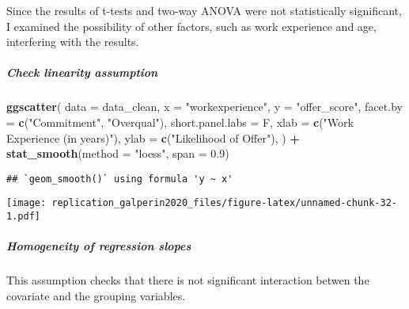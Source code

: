 \documentclass[]{article}
\newenvironment{Shaded}{\begin{snugshade}}{\end{snugshade}}
\newcommand{\DataTypeTok}[1]{\textcolor[rgb]{0.13,0.29,0.53}{#1}}
\newcommand{\FloatTok}[1]{\textcolor[rgb]{0.00,0.00,0.81}{#1}}
\newcommand{\KeywordTok}[1]{\textcolor[rgb]{0.13,0.29,0.53}{\textbf{#1}}}
\newcommand{\NormalTok}[1]{#1}
\newcommand{\OperatorTok}[1]{\textcolor[rgb]{0.81,0.36,0.00}{\textbf{#1}}}
\newcommand{\StringTok}[1]{\textcolor[rgb]{0.31,0.60,0.02}{#1}}
\let\oldsubparagraph\subparagraph
\renewcommand{\subparagraph}[1]{\oldsubparagraph{#1}\mbox{}}
\begin{document}
Since the results of t-tests and two-way ANOVA were not statistically
significant, I examined the possibility of other factors, such as work
experience and age, interfering with the results.

\hypertarget{check-linearity-assumption}{%
\subparagraph{Check linearity
assumption}\label{check-linearity-assumption}}

\begin{Shaded}
\begin{Highlighting}[]
\KeywordTok{ggscatter}\NormalTok{(}
  \DataTypeTok{data =}\NormalTok{ data_clean, }\DataTypeTok{x =} \StringTok{"workexperience"}\NormalTok{, }\DataTypeTok{y =} \StringTok{"offer_score"}\NormalTok{,}
  \DataTypeTok{facet.by =} \KeywordTok{c}\NormalTok{(}\StringTok{"Commitment"}\NormalTok{, }\StringTok{"Overqual"}\NormalTok{),}
  \DataTypeTok{short.panel.labs =}\NormalTok{ F,}
  \DataTypeTok{xlab =} \KeywordTok{c}\NormalTok{(}\StringTok{"Work Experience (in years)"}\NormalTok{),}
  \DataTypeTok{ylab =} \KeywordTok{c}\NormalTok{(}\StringTok{"Likelihood of Offer"}\NormalTok{),}
\NormalTok{) }\OperatorTok{+}
\StringTok{  }\KeywordTok{stat_smooth}\NormalTok{(}\DataTypeTok{method =} \StringTok{"loess"}\NormalTok{, }\DataTypeTok{span =} \FloatTok{0.9}\NormalTok{)}
\end{Highlighting}
\end{Shaded}

\begin{verbatim}
## `geom_smooth()` using formula 'y ~ x'
\end{verbatim}

\texttt{[image: replication\_galperin2020\_files/figure-latex/unnamed-chunk-32-1.pdf]}

\hypertarget{homogeneity-of-regression-slopes}{%
\subparagraph{Homogeneity of regression
slopes}\label{homogeneity-of-regression-slopes}}

This assumption checks that there is not significant interaction betwen
the covariate and the grouping variables.

\begin{Shaded}
\end{Shaded}
\end{document}
